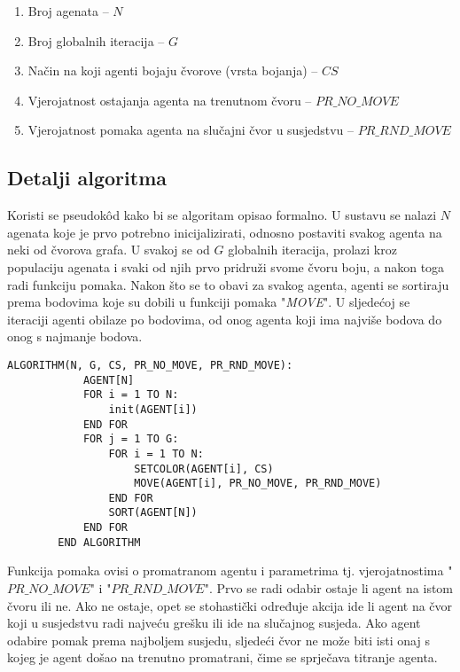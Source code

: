 \documentclass[times, utf8, diplomski, numeric]{fer}
\begin{document}
\begin{enumerate}
	\item Broj agenata -- $N$
	\item Broj globalnih iteracija -- $G$
	\item Način na koji agenti bojaju čvorove (vrsta bojanja) -- $CS$
	\item Vjerojatnost ostajanja agenta na trenutnom čvoru -- $PR\_NO\_MOVE$
	\item Vjerojatnost pomaka agenta na slučajni čvor u susjedstvu -- $PR\_RND\_MOVE$
\end{enumerate}

\subsection{Detalji algoritma}

Koristi se pseudok\^{o}d kako bi se algoritam opisao formalno. U sustavu se nalazi $N$ agenata koje je prvo potrebno inicijalizirati, odnosno postaviti svakog agenta na neki od čvorova grafa. U svakoj se od $G$ globalnih iteracija, prolazi kroz populaciju agenata i svaki od njih prvo pridruži svome čvoru boju, a nakon toga radi funkciju pomaka. Nakon što se to obavi za svakog agenta, agenti se sortiraju prema bodovima koje su dobili u funkciji pomaka "\emph{MOVE}". U sljedećoj se iteraciji agenti obilaze po bodovima, od onog agenta koji ima najviše bodova do onog s najmanje bodova.

\begin{singlespace}
	\begin{lstlisting}[caption=Pseudok\^{o}d agentskog algoritma]
		ALGORITHM(N, G, CS, PR_NO_MOVE, PR_RND_MOVE):
			AGENT[N]
			FOR i = 1 TO N:
				init(AGENT[i])
			END FOR
			FOR j = 1 TO G:
				FOR i = 1 TO N:
					SETCOLOR(AGENT[i], CS)
					MOVE(AGENT[i], PR_NO_MOVE, PR_RND_MOVE)
				END FOR
				SORT(AGENT[N])
			END FOR
		END ALGORITHM
	\end{lstlisting}
\end{singlespace}

Funkcija pomaka ovisi o promatranom agentu i parametrima tj. vjerojatnostima "$PR\_NO\_MOVE$" i "$PR\_RND\_MOVE$". Prvo se radi odabir ostaje li agent na istom čvoru ili ne. Ako ne ostaje, opet se stohastički određuje akcija ide li agent na čvor koji u susjedstvu radi najveću grešku ili ide na slučajnog susjeda. Ako agent odabire pomak prema najboljem susjedu, sljedeći čvor ne može biti isti onaj s kojeg je agent došao na trenutno promatrani, čime se sprječava titranje agenta.
\end{document}
